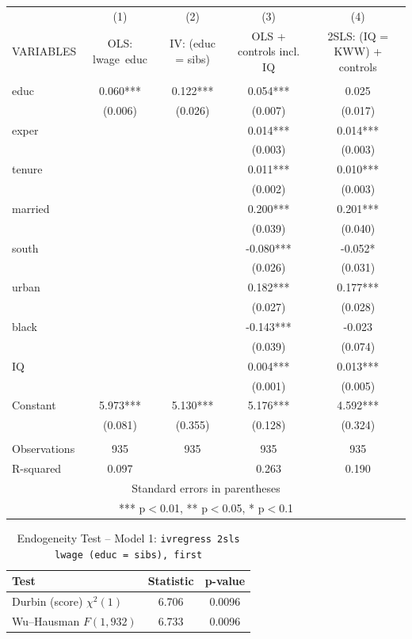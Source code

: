\documentclass[]{article}
\begin{document}
\begin{tabular}{lcccc} \hline
 & (1) & (2) & (3) & (4) \\
VARIABLES & OLS: lwage~educ & IV: (educ = sibs) & OLS + controls incl. IQ & 2SLS: (IQ = KWW) + controls \\ \hline
 &  &  &  &  \\
educ & 0.060*** & 0.122*** & 0.054*** & 0.025 \\
 & (0.006) & (0.026) & (0.007) & (0.017) \\
exper &  &  & 0.014*** & 0.014*** \\
 &  &  & (0.003) & (0.003) \\
tenure &  &  & 0.011*** & 0.010*** \\
 &  &  & (0.002) & (0.003) \\
married &  &  & 0.200*** & 0.201*** \\
 &  &  & (0.039) & (0.040) \\
south &  &  & -0.080*** & -0.052* \\
 &  &  & (0.026) & (0.031) \\
urban &  &  & 0.182*** & 0.177*** \\
 &  &  & (0.027) & (0.028) \\
black &  &  & -0.143*** & -0.023 \\
 &  &  & (0.039) & (0.074) \\
IQ &  &  & 0.004*** & 0.013*** \\
 &  &  & (0.001) & (0.005) \\
Constant & 5.973*** & 5.130*** & 5.176*** & 4.592*** \\
 & (0.081) & (0.355) & (0.128) & (0.324) \\
 &  &  &  &  \\
Observations & 935 & 935 & 935 & 935 \\
 R-squared & 0.097 &  & 0.263 & 0.190 \\ \hline
\multicolumn{5}{c}{ Standard errors in parentheses} \\
\multicolumn{5}{c}{ *** p$<$0.01, ** p$<$0.05, * p$<$0.1} \\
\end{tabular}

\begin{table}[htbp]\centering
\caption{Endogeneity Test -- Model 1: \texttt{ivregress 2sls lwage (educ = sibs), first}}
\begin{tabular}{lcc}
\toprule
\textbf{Test} & \textbf{Statistic} & \textbf{p-value} \\
\midrule
Durbin (score) $\chi^2(1)$ & 6.706 & 0.0096 \\
Wu--Hausman $F(1,932)$     & 6.733 & 0.0096 \\
\bottomrule
\end{tabular}
\end{table}
\end{document}
